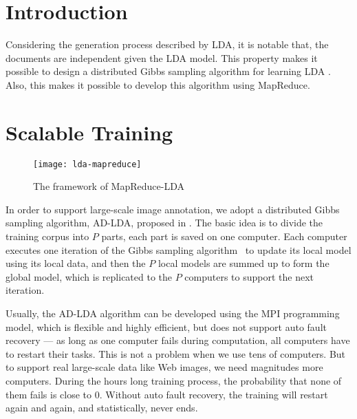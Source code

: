 
\section{Introduction}
Considering the generation process described by LDA, it is notable
that, the documents are independent given the LDA model.  This
property makes it possible to design a distributed Gibbs sampling
algorithm for learning LDA \cite{dist-lda-gibbs}.  Also, this makes it
possible to develop this algorithm using MapReduce.


\section{Scalable Training}
\label{sec:model_train}

\begin{figure}
  \centering
  \texttt{[image: lda-mapreduce]}
  \caption{The framework of MapReduce-LDA}
  \label{fig:mapreduce-lda}
\end{figure}

In order to support large-scale image annotation, we adopt a
distributed Gibbs sampling algorithm, AD-LDA, proposed in
\cite{dist-lda-gibbs}.  The basic idea is to divide the training
corpus into $P$ parts, each part is saved on one computer.  Each
computer executes one iteration of the Gibbs sampling
algorithm~\cite{lda_gibbs} to update its local model using its local
data, and then the $P$ local models are summed up to form the global
model, which is replicated to the $P$ computers to support the next
iteration.

Usually, the AD-LDA algorithm can be developed using the MPI
programming model, which is flexible and highly efficient, but does
not support auto fault recovery --- as long as one computer fails
during computation, all computers have to restart their tasks.  This
is not a problem when we use tens of computers.  But to support real
large-scale data like Web images, we need magnitudes more computers.
During the hours long training process, the probability that none of
them fails is close to 0.  Without auto fault recovery, the training
will restart again and again, and statistically, never ends.

